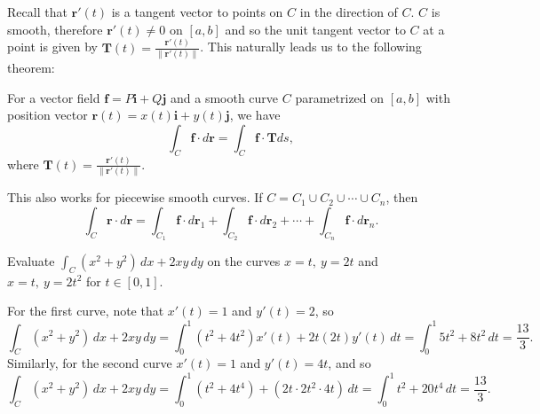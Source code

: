 Recall that $\mathbf r'(t)$ is a tangent vector to points on $C$ in the direction of $C$. $C$ is smooth, therefore $\mathbf r'(t)\neq 0$ on $[a,b]$ and so the unit tangent vector to $C$ at a point is given by $\mathbf T(t)= \frac{\mathbf r'(t)}{\|\mathbf r'(t)\|}  $. This naturally leads us to the following theorem:
\begin{theorem}
    For a vector field $\mathbf f= P\mathbf i+Q\mathbf j$ and a smooth curve $C$ parametrized on $[a,b]$ with position vector $\mathbf r(t)=x(t)\mathbf i+y(t)\mathbf j$, we have \[
        \int_{C}^{} \mathbf f \cdot  d\mathbf r=\int_{C}^{} \mathbf f\cdot \mathbf T ds,
    \] where $\mathbf T(t)=\frac{\mathbf r'(t)}{\|\mathbf r'(t)\|}$.
\end{theorem}
This also works for piecewise smooth curves. If $C=C_1\cup C_2\cup \cdots \cup C_n $, then \[
\int_{C}^{} \mathbf r\cdot d\mathbf r=\int_{C_1}^{} \mathbf f \cdot d\mathbf r_1+\int_{C_2}^{} \mathbf f\cdot d\mathbf r_2+\cdots +\int_{C_n }^{} \mathbf f\cdot d\mathbf r_n .
\] 
\begin{example}
    Evaluate $\int_{C}^{} (x^2+y^2) \, dx+2xy\,dy$ on the curves $x=t, \ y=2t$ and $x=t,\ y=2t^2$ for $t\in [0,1]$.
\end{example}
\begin{solution}
    For the first curve, note that $x'(t)=1$ and $y'(t)=2$, so \[
        \int_{C}^{} (x^2+y^2) \, dx+2xy \, dy=\int_{0}^{1} (t^2+4t^2)x'(t) +2t(2t)y'(t)\, dt=\int_{0}^{1} 5t^2+8t^2 \, dt=\frac{13}{3}.
    \] Similarly, for the second curve $x'(t)=1$ and $y'(t)=4t$, and so \[
    \int_{C}^{} (x^2+y^2) \, dx+2xy\, dy=\int_{0}^{1} (t^2+4t^4)+(2t\cdot 2t^2\cdot 4t) \, dt=\int_{0}^{1} t^2+20t^4 \, dt=\frac{13}{3}.
    \] 
\end{solution}
